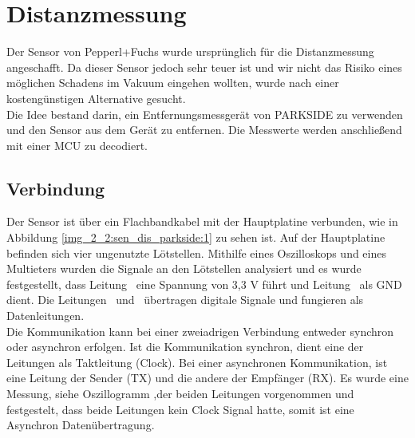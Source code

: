 \newpage
\section{Distanzmessung}
\label{Distanzmessung}
%
%
%
Der Sensor von Pepperl+Fuchs wurde ursprünglich für die Distanzmessung angeschafft. Da dieser Sensor jedoch sehr teuer ist und wir nicht das Risiko eines möglichen Schadens im Vakuum eingehen wollten, wurde nach einer kostengünstigen Alternative gesucht.\\
Die Idee bestand darin, ein Entfernungsmessgerät von PARKSIDE zu verwenden und den Sensor aus dem Gerät zu entfernen. Die Messwerte werden anschließend mit einer MCU zu decodiert.

\subsection{Verbindung}
Der Sensor ist über ein Flachbandkabel mit der Hauptplatine verbunden, wie in Abbildung \ref{img_2_2:sen_dis_parkside:1} zu sehen ist. Auf der Hauptplatine befinden sich vier ungenutzte Lötstellen. Mithilfe eines Oszilloskops und eines Multieters wurden die Signale an den Lötstellen analysiert und es wurde festgestellt, dass Leitung \flqq\ eine Spannung von 3,3 V führt und Leitung \flqq\ als GND dient. Die Leitungen \flqq\ und \flqq\ übertragen digitale Signale und fungieren als Datenleitungen.\\
Die Kommunikation kann bei einer zweiadrigen Verbindung entweder synchron oder asynchron erfolgen. Ist die Kommunikation synchron, dient eine der Leitungen als Taktleitung (Clock). Bei einer asynchronen Kommunikation, ist eine Leitung der Sender (TX) und die andere der Empfänger (RX). Es wurde eine Messung, siehe Oszillogramm ,der beiden Leitungen vorgenommen und festgestelt, dass beide Leitungen kein Clock Signal hatte, somit ist eine Asynchron Datenübertragung.

